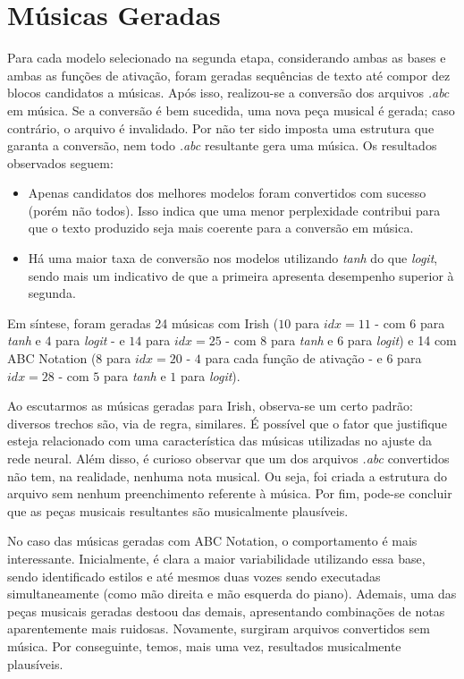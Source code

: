 \documentclass[twoside]{automatextcc}
\begin{document}
\section{Músicas Geradas}
Para cada modelo selecionado na segunda etapa, considerando ambas as bases e ambas as funções de ativação, foram geradas sequências de texto até compor dez blocos candidatos a músicas. Após isso, realizou-se a conversão dos arquivos \textit{.abc} em música. Se a conversão é bem sucedida, uma nova peça musical é gerada; caso contrário, o arquivo é invalidado. Por não ter sido imposta uma estrutura que garanta a conversão, nem todo \textit{.abc} resultante gera uma música. Os resultados observados seguem:
\begin{itemize}
    \item Apenas candidatos dos melhores modelos foram convertidos com sucesso (porém não todos). Isso indica que uma menor perplexidade contribui para que o texto produzido seja mais coerente para a conversão em música.
    \item Há uma maior taxa de conversão nos modelos utilizando \textit{tanh} do que \textit{logit}, sendo mais um indicativo de que a primeira apresenta desempenho superior à segunda.
\end{itemize}
Em síntese, foram geradas 24 músicas com Irish ($10$ para $idx=11$ - com $6$ para \textit{tanh} e $4$ para \textit{logit} - e $14$ para $idx=25$ - com $8$ para \textit{tanh} e $6$ para \textit{logit}) e 14 com ABC Notation ($8$ para $idx=20$ - $4$ para cada função de ativação - e $6$ para $idx=28$ - com $5$ para \textit{tanh} e $1$ para \textit{logit}).

Ao escutarmos as músicas geradas para Irish, observa-se um certo padrão: diversos trechos são, via de regra, similares. É possível que o fator que justifique esteja relacionado com uma característica das músicas utilizadas no ajuste da rede neural. Além disso, é curioso observar que um dos arquivos \textit{.abc} convertidos não tem, na realidade, nenhuma nota musical. Ou seja, foi criada a estrutura do arquivo sem nenhum preenchimento referente à música. Por fim, pode-se concluir que as peças musicais resultantes são musicalmente plausíveis.

No caso das músicas geradas com ABC Notation, o comportamento é mais interessante. Inicialmente, é clara a maior variabilidade utilizando essa base, sendo identificado estilos e até mesmos duas vozes sendo executadas simultaneamente (como mão direita e mão esquerda do piano). Ademais, uma das peças musicais geradas destoou das demais, apresentando combinações de notas aparentemente mais ruidosas. Novamente, surgiram arquivos convertidos sem música. Por conseguinte, temos, mais uma vez, resultados musicalmente plausíveis.
\end{document}
